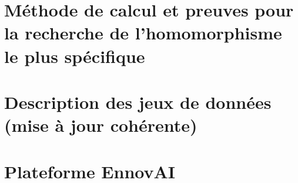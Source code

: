 ﻿\chapter{Méthode de calcul et preuves pour la recherche de l'homomorphisme le plus spécifique}
\label{appendice:most-specific}


\chapter{Description des jeux de données (mise à jour cohérente)}
\label{appendice:datasets}


\chapter{Plateforme EnnovAI}

